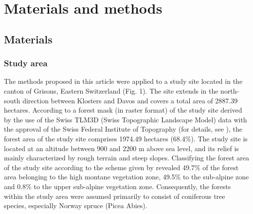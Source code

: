 
\section{Materials and methods}
\label{sec:Meth}



\subsection{Materials}
\label{sec:mat}

\subsubsection{Study area}
\label{sec:studarea}

The methods proposed in this article were applied to a study site located in the canton of Grisons, Eastern Switzerland (Fig. 1). The site extends in the north-south direction between Klosters and Davos and covers a total area of 2887.39 hectares. According to a forest mask (in raster format) of the study site derived by the use of the Swiss TLM3D (Swiss Topographic Landscape Model) data with the approval of the Swiss Federal Institute of Topography (for details, see \citet{hill2013}), the forest area of the study site comprises 1974.49 hectares (68.4\%). The study site is located at an altitude between 900 and 2200 m above sea level, and its relief is mainly characterized by rough terrain and steep slopes. Classifying the forest area of the study site according to the scheme given by \citep{ott1997} revealed 49.7\% of the forest area belonging to the high montane vegetation  zone, 49.5\% to the sub-alpine zone and 0.8\% to the upper sub-alpine vegetation zone. Consequently, the forests within the study area were assumed primarily to consist of coniferous tree species, especially Norway spruce (Picea Abies).

